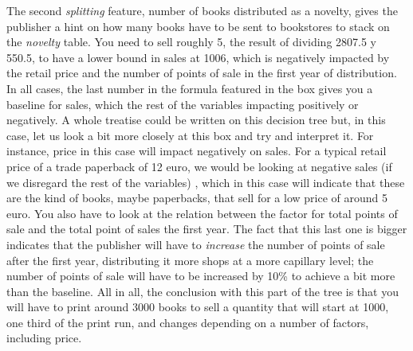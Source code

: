 \documentclass[a4paper,10pt,twocolumn,preprint,3p]{elsarticle}
\begin{document}
The second {\em splitting} feature, number of books distributed as a
novelty, gives the publisher a hint on how many books have to be sent
to bookstores to stack on the {\em novelty} table. You need to sell
roughly 5, the result of dividing 2807.5 y 550.5, to have a lower
bound in sales at 1006, which is negatively impacted by the retail
price and the number of points of sale in the first year of
distribution. In all cases, the last number in the formula featured in
the box gives you a baseline for sales, which the rest of the
variables impacting positively or negatively. A whole treatise could
be written on this decision tree but, in this case, let us look a bit
more closely at this box and try and interpret it. For instance, price
in this case will impact negatively on sales. For a typical retail
price of a trade paperback of 12 euro, we would be looking at negative
sales (if we disregard the rest of the variables) , which in this case
will indicate that these are the kind of books, maybe paperbacks, that
sell for a low price of around 5 euro. You also have to look at the
relation between the factor for total points of sale and the total
point of sales the first year. The fact that this last one is bigger
indicates that the publisher will have to {\em increase} the number of
points of sale after the first year, distributing it more shops at a
more capillary level; the number of points of sale will have to be
increased by 10\% to achieve a bit more than the baseline. All in all,
the conclusion with this part of the tree is that you will have to
print around 3000 books to sell a quantity that will start at 1000,
one third of the print run, and changes depending on a number of
factors, including price.
\end{document}
